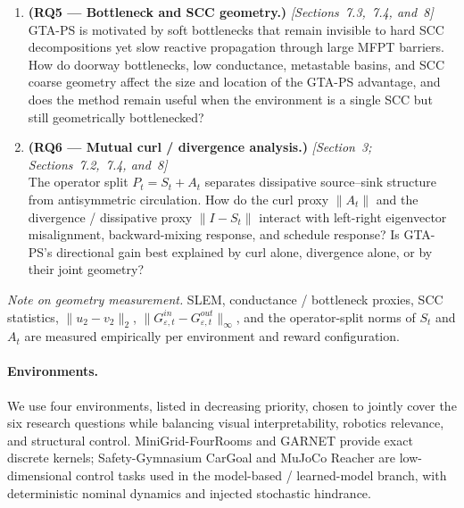 \documentclass[10pt,a4paper]{article}
\begin{document}
\begin{enumerate}
  \item \textbf{(RQ5 --- Bottleneck and SCC geometry.)} \textit{[Sections~7.3,~7.4, and~8]}\\
    GTA-PS is motivated by soft bottlenecks that remain invisible to hard SCC decompositions
    yet slow reactive propagation through large MFPT barriers.  How do doorway bottlenecks,
    low conductance, metastable basins, and SCC coarse geometry affect the size and location
    of the GTA-PS advantage, and does the method remain useful when the environment is a single
    SCC but still geometrically bottlenecked?

  \item \textbf{(RQ6 --- Mutual curl / divergence analysis.)} \textit{[Section~3; Sections~7.2,~7.4, and~8]}\\
    The operator split $P_t = S_t + A_t$ separates dissipative source--sink structure from
    antisymmetric circulation.  How do the curl proxy $\|A_t\|$ and the divergence / dissipative
    proxy $\|I-S_t\|$ interact with left-right eigenvector misalignment, backward-mixing response, and schedule
    response?  Is GTA-PS's directional gain best explained by curl alone, divergence alone,
    or by their joint geometry?
\end{enumerate}

\noindent\textit{Note on geometry measurement.}
SLEM, conductance / bottleneck proxies, SCC statistics, $\|u_2-v_2\|_2$,
$\|G^{in}_{\varepsilon,t}-G^{out}_{\varepsilon,t}\|_\infty$, and the operator-split norms
of $S_t$ and $A_t$ are measured empirically per environment and reward configuration.



\paragraph{Environments.}
We use four environments, listed in decreasing priority, chosen to jointly cover the six research questions while balancing visual interpretability, robotics relevance, and structural control.  MiniGrid-FourRooms and GARNET provide exact discrete kernels; Safety-Gymnasium CarGoal and MuJoCo Reacher are low-dimensional control tasks used in the model-based / learned-model branch, with deterministic nominal dynamics and injected stochastic hindrance.
\end{document}
